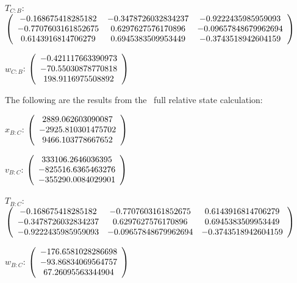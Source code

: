 \begin{description}
$T_{C:B}$: $\left( \begin{array} {ccc}
-0.168675418285182 &   -0.3478726032834237 &   -0.9222435985959093 \\
-0.7707603161852675 &    0.6297627576170896 &  -0.09657848679962694 \\
0.6143916814706279 &    0.6945383509953449 &   -0.3743518942604159 \\
\end{array} \right)\\ \\$

$w_{C:B}$:  $\left( \begin{array} {ccc} -0.421117663390973 \\    -70.55030878770818 \\     198.9116975508892
\end{array} \right)\\ \\$

The following are the results from the \ full relative state calculation:

$x_{B:C}$: $\left( \begin{array} {ccc} 2889.062603090087 \\    -2925.810301475702 \\     9466.103778667652
\end{array} \right)\\ \\$

$v_{B:C}$:  $\left( \begin{array} {ccc}  333106.2646036395 \\    -825516.6365463276 \\    -355290.0084029901
\end{array} \right)\\ \\$

$T_{B:C}$: $\left( \begin{array} {ccc}
 -0.168675418285182 &   -0.7707603161852675 &    0.6143916814706279 \\
 -0.3478726032834237 &    0.6297627576170896 &    0.6945383509953449 \\
 -0.9222435985959093 &  -0.09657848679962694 &   -0.3743518942604159 \\
\end{array} \right)\\ \\$

$w_{B:C}$:  $\left( \begin{array} {ccc}  -176.6581028286698 \\    -93.86834069564757 \\     67.26095563344904
\end{array} \right)\\ \\$


\end{description}
